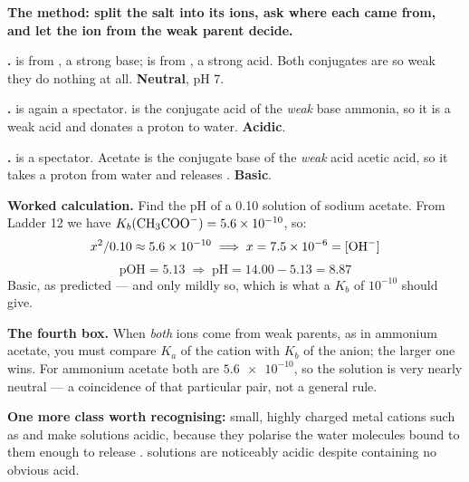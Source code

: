 \documentclass{apchem-worksheet}
\begin{document}
\begin{workedexample}
\textbf{The method: split the salt into its ions, ask where each came
from, and let the ion from the weak parent decide.}

\textbf{.}  is from , a strong base;
 is from , a strong acid. Both conjugates are so weak
they do nothing at all. \textbf{Neutral}, pH 7.

\textbf{.}  is again a spectator.  is the
conjugate acid of the \emph{weak} base ammonia, so it is a weak acid and
donates a proton to water. \textbf{Acidic}.

\textbf{.}  is a spectator. Acetate is the
conjugate base of the \emph{weak} acid acetic acid, so it takes a
proton from water and releases . \textbf{Basic}.

\textbf{Worked calculation.} Find the pH of a \SI{0.10}{\Molar}
solution of sodium acetate. From Ladder 12 we have
$K_{b}(\ce{CH3COO-}) = \num{5.6e-10}$, so:
\[ x^{2}/0.10 \approx \num{5.6e-10}
   \;\Longrightarrow\;
   x = \num{7.5e-6} = [\ce{OH-}] \]
\[ \text{pOH} = 5.13
   \;\Longrightarrow\;
   \text{pH} = 14.00 - 5.13 = \mathbf{8.87} \]
Basic, as predicted --- and only mildly so, which is what a $K_{b}$ of
$10^{-10}$ should give.

\textbf{The fourth box.} When \emph{both} ions come from weak parents,
as in ammonium acetate, you must compare $K_{a}$ of the cation with
$K_{b}$ of the anion; the larger one wins. For ammonium acetate both are
$\num{5.6e-10}$, so the solution is very nearly neutral --- a
coincidence of that particular pair, not a general rule.

\textbf{One more class worth recognising:} small, highly charged metal
cations such as  and  make solutions acidic, because
they polarise the water molecules bound to them enough to release
.  solutions are noticeably acidic despite containing
no obvious acid.
\end{workedexample}
\end{document}

